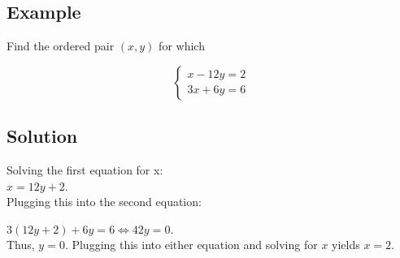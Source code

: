 \documentclass[11pt,letterpaper]{article}
\begin{document}
\begin{minipage}{\textwidth}
\begin{itemize}
\begin{itemize}
               \subsection*{Example}
               Find the ordered pair $(x,y)$ for which
               
               \[\left\{\begin{array}{l}x-12y=2\\3x+6y=6\end{array}\right.\]
               \subsection*{Solution}
               Solving the first equation for x:
               \\ $x = 12y + 2.$
               \\
               Plugging this into the second equation:
               
               $3(12y + 2) + 6y = 6 \Leftrightarrow 42 y = 0.$
               \\
               Thus, $y=0$. Plugging this into either equation and solving for $x$ yields $x=2$.
          \end{itemize}
     \end{itemize}
\end{minipage}
\vspace{0.4cm}
\end{document}
